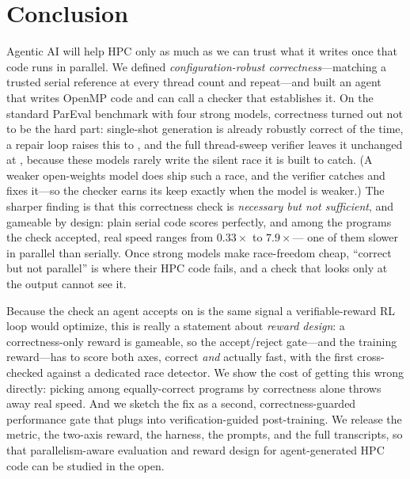\section{Conclusion}
\label{sec:conclusion}

Agentic AI will help HPC only as much as we can trust what it writes once that code runs in
parallel. We defined \emph{configuration-robust correctness}---matching a trusted serial
reference at every thread count and repeat---and built an agent that writes OpenMP code and
can call a checker that establishes it. On the standard ParEval benchmark with four strong
models, correctness turned out not to be the hard part: single-shot generation is already
robustly correct \Lzerorate{} of the time, a repair loop raises this to \Lonerate{}, and the
full thread-sweep verifier leaves it unchanged at \Ltworate{}, because these models rarely
write the silent race it is built to catch. (A weaker open-weights model does ship such a
race, and the verifier catches and fixes it---so the checker earns its keep exactly when the
model is weaker.) The sharper finding is that this correctness check is \emph{necessary but
not sufficient}, and gameable by design: plain serial code scores perfectly, and among the
\Ntimed{} programs the check accepted, real speed ranges from $0.33\times$ to $7.9\times$---
one of them slower in parallel than serially. Once strong models make race-freedom cheap,
``correct but not parallel'' is where their HPC code fails, and a check that looks only at
the output cannot see it.

Because the check an agent accepts on is the same signal a verifiable-reward RL loop would
optimize, this is really a statement about \emph{reward design}: a correctness-only reward is
gameable, so the accept/reject gate---and the training reward---has to score both axes,
correct \emph{and} actually fast, with the first cross-checked against a dedicated race
detector. We show the cost of getting this wrong directly: picking among equally-correct
programs by correctness alone throws away real speed. And we sketch the fix as a second,
correctness-guarded performance gate that plugs into verification-guided post-training. We
release the metric, the two-axis reward, the harness, the prompts, and the full transcripts,
so that parallelism-aware evaluation and reward design for agent-generated HPC code can be
studied in the open.
